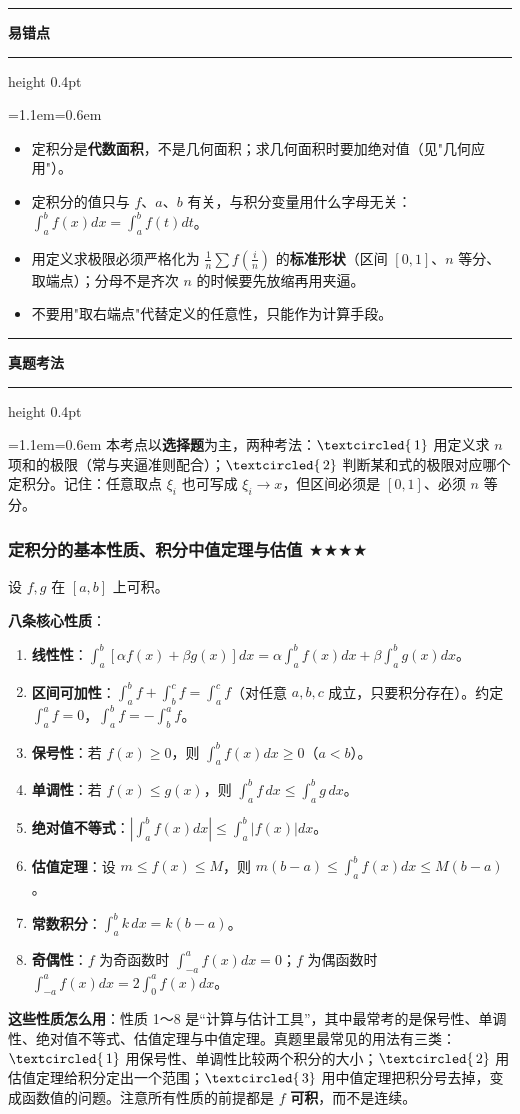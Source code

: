 \documentclass[11pt,openany,UTF8]{ctexbook}
\newcommand{\circled}[1]{\textcircled{\scriptsize\,#1}}
\newcommand{\callouthead}[2]{%
  \par\addvspace{7pt}\noindent
  {\color{#1}\rule[-0.15em]{3pt}{1.05em}}\hspace{0.5em}%
  {\bfseries\color{#1}#2}\par\nobreak\vspace{-0.35em}%
  {\color{rulesep}\hrule height 0.4pt}\nobreak\vspace{0.45em}%
  \begingroup\small\setlength{\parindent}{0pt}%
  \leftskip=1.1em\rightskip=0.6em\noindent\ignorespaces}
\newcommand{\calloutend}{\par\endgroup\addvspace{7pt}}
\newenvironment{callwarn}[1]{\callouthead{warnbar}{#1}}{\calloutend}
\newenvironment{callexam}[1]{\callouthead{exambar}{#1}}{\calloutend}
\begin{document}
\begin{callwarn}{易错点}
\begin{itemize}
\item 定积分是\textbf{代数面积}，不是几何面积；求几何面积时要加绝对值（见"几何应用"）。
\item 定积分的值只与 $f$、$a$、$b$ 有关，与积分变量用什么字母无关：$\int_a^bf(x)dx=\int_a^bf(t)dt$。
\item 用定义求极限必须严格化为 $\frac{1}{n}\sum f\left(\frac{i}{n}\right)$ 的\textbf{标准形状}（区间 $[0,1]$、$n$ 等分、取端点）；分母不是齐次 $n$ 的时候要先放缩再用夹逼。
\item 不要用"取右端点"代替定义的任意性，只能作为计算手段。
\end{itemize}
\end{callwarn}

\begin{callexam}{真题考法}
本考点以\textbf{选择题}为主，两种考法：$\circled{1}$ 用定义求 $n$ 项和的极限（常与夹逼准则配合）；$\circled{2}$ 判断某和式的极限对应哪个定积分。记住：任意取点 $\xi_i$ 也可写成 $\xi_i\to x$，但区间必须是 $[0,1]$、必须 $n$ 等分。

\end{callexam}

\subsubsection{定积分的基本性质、积分中值定理与估值 $\bigstar$$\bigstar$$\bigstar$$\bigstar$}

设 $f,g$ 在 $[a,b]$ 上可积。

\textbf{八条核心性质}：

\begin{enumerate}
\item \textbf{线性性}：$\int_a^b\left[\alpha f(x)+\beta g(x)\right]dx=\alpha\int_a^bf(x)dx+\beta\int_a^bg(x)dx$。
\item \textbf{区间可加性}：$\int_a^bf+\int_b^cf=\int_a^cf$（对任意 $a,b,c$ 成立，只要积分存在）。约定 $\int_a^af=0$，$\int_a^bf=-\int_b^af$。
\item \textbf{保号性}：若 $f(x)\geq0$，则 $\int_a^bf(x)dx\geq0$（$a<b$）。
\item \textbf{单调性}：若 $f(x)\leq g(x)$，则 $\int_a^bf\,dx\leq\int_a^bg\,dx$。
\item \textbf{绝对值不等式}：$\left\lvert\int_a^bf(x)dx\right\rvert\leq\int_a^b\lvert f(x)\rvert dx$。
\item \textbf{估值定理}：设 $m\leq f(x)\leq M$，则 $m(b-a)\leq\int_a^bf(x)dx\leq M(b-a)$。
\item \textbf{常数积分}：$\int_a^bk\,dx=k(b-a)$。
\item \textbf{奇偶性}：$f$ 为奇函数时 $\int_{-a}^af(x)dx=0$；$f$ 为偶函数时 $\int_{-a}^af(x)dx=2\int_0^af(x)dx$。
\end{enumerate}
\textbf{这些性质怎么用}：性质 1～8 是“计算与估计工具”，其中最常考的是保号性、单调性、绝对值不等式、估值定理与中值定理。真题里最常见的用法有三类：$\circled{1}$ 用保号性、单调性比较两个积分的大小；$\circled{2}$ 用估值定理给积分定出一个范围；$\circled{3}$ 用中值定理把积分号去掉，变成函数值的问题。注意所有性质的前提都是 $f$ \textbf{可积}，而不是连续。
\end{document}
